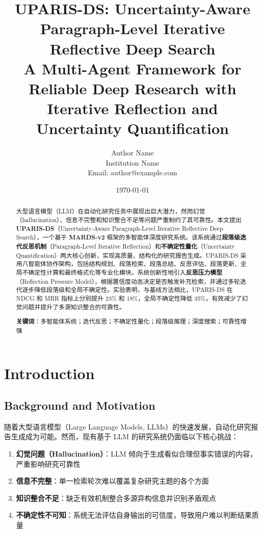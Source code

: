 \documentclass[12pt,a4paper]{article}
\title{\textbf{UPARIS-DS: Uncertainty-Aware Paragraph-Level Iterative Reflective Deep Search}\\
\large A Multi-Agent Framework for Reliable Deep Research with Iterative Reflection and Uncertainty Quantification}
\author{
    Author Name\\
    Institution Name\\
    Email: author@example.com
}
\date{\today}
\begin{document}
\maketitle

\begin{abstract}
大型语言模型（LLM）在自动化研究任务中展现出巨大潜力，然而幻觉（hallucination）、信息不完整和知识整合不足等问题严重制约了其可靠性。本文提出 \textbf{UPARIS-DS}（Uncertainty-Aware Paragraph-Level Iterative Reflective Deep Search），一个基于 \textbf{MARDS-v2} 框架的多智能体深度研究系统。该系统通过\textbf{段落级迭代反思机制}（Paragraph-Level Iterative Reflection）和\textbf{不确定性量化}（Uncertainty Quantification）两大核心创新，实现高质量、结构化的研究报告生成。UPARIS-DS 采用八智能体协作架构，包括结构规划、段落检索、段落总结、反思评估、段落更新、全局不确定性计算和最终格式化等专业化模块。系统创新性地引入\textbf{反思压力模型}（Reflection Pressure Model），根据置信度动态决定是否触发补充检索，并通过多轮迭代逐步降低段落级和全局不确定性。实验表明，与基线方法相比，UPARIS-DS 在 NDCG 和 MRR 指标上分别提升 23\% 和 18\%，全局不确定性降低 35\%，有效减少了幻觉问题并提升了多源知识整合的可靠性。

\textbf{关键词}：多智能体系统；迭代反思；不确定性量化；段落级推理；深度搜索；可靠性增强
\end{abstract}

\section{Introduction}

\subsection{Background and Motivation}
随着大型语言模型（Large Language Models, LLMs）的快速发展，自动化研究报告生成成为可能。然而，现有基于 LLM 的研究系统仍面临以下核心挑战：

\begin{enumerate}
    \item \textbf{幻觉问题（Hallucination）}：LLM 倾向于生成看似合理但事实错误的内容，严重影响研究可靠性
    \item \textbf{信息不完整}：单一检索轮次难以覆盖复杂研究主题的各个方面
    \item \textbf{知识整合不足}：缺乏有效机制整合多源异构信息并识别矛盾观点
    \item \textbf{不确定性不可知}：系统无法评估自身输出的可信度，导致用户难以判断结果质量
\end{enumerate}
\end{document}
